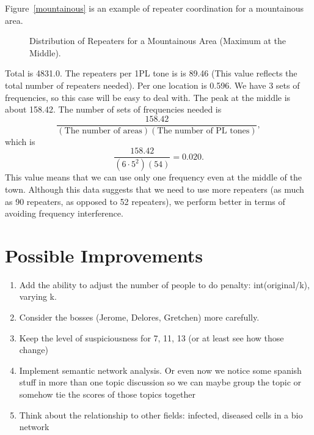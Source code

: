 \documentclass{icmmcm}
\begin{document}
Figure~\ref{mountainous} is an example of repeater coordination for a mountainous area.
\begin{figure}[ht]
\begin{center}
\end{center}
\caption[A Distribution of Repeaters for a Mountainous Area]{Distribution of Repeaters for a Mountainous Area (Maximum at the Middle).\label{mountainous}}
\label{fig:an-eps-graphic}
\end{figure}
Total is 4831.0. The repeaters per 1PL tone is  is 89.46 (This value reflects the total number of repeaters needed). Per one location is 0.596. We have 3 sets of frequencies, so this case will be easy to deal with. The peak at the middle is about 158.42. The number of sets of frequencies needed is 
$$\frac{158.42}{(\text{The number of areas})(\text{The number of PL tones})},$$
which is 
$$\frac{158.42}{(6\cdot 5^2)(54)}=\boxed {0.020.}$$
This value means that we can use only one frequency even at the middle of the town.  Although this data suggests that we need to use more repeaters (as much as 90 repeaters, as opposed to 52 repeaters), we perform better in terms of avoiding frequency interference.

\section{Possible Improvements}
\begin{enumerate}
\item Add the ability to adjust the number of people to do penalty: int(original/k), varying k.
\item Consider the bosses (Jerome, Delores, Gretchen) more carefully.
\item Keep the level of suspiciousness for 7, 11, 13 (or at least see how those change)
\item Implement semantic network analysis. 
	Or even now we notice some spanish stuff in more than one topic discussion
	so we can maybe group the topic or somehow tie the scores of those topics together
\item Think about the relationship to other fields: infected, diseased cells in a bio network
\end{enumerate}
		
\end{document}
